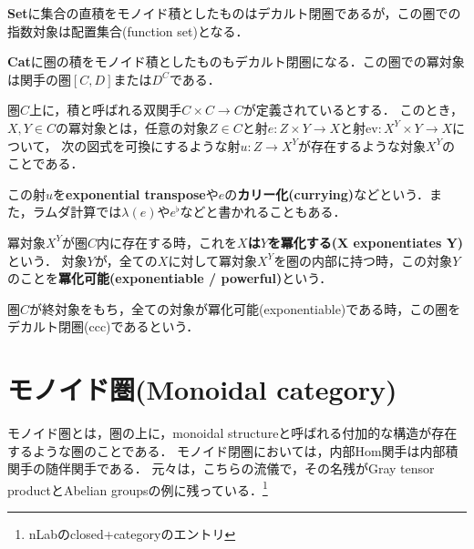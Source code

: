 \documentclass[uplatex, dvipdfmx]{jsreport}
\begin{document}
\textbf{Set}に集合の直積をモノイド積としたものはデカルト閉圏であるが，この圏での指数対象は配置集合(function set)となる．

\textbf{Cat}に圏の積をモノイド積としたものもデカルト閉圏になる．この圏での冪対象は関手の圏$[C,D]$または$D^C$である．

\begin{definition}\rm{}
    圏$C$上に，積と呼ばれる双関手$C\times C\to C$が定義されているとする．
    このとき，$X, Y\in C$の冪対象とは，任意の対象$Z\in C$と射$e:Z\times Y\to X$と射$\mathrm{ev}:X^Y\times Y\to X$について，
    次の図式を可換にするような射$u:Z\to X^Y$が存在するような対象$X^Y$のことである．
    \begin{center}\end{center}
    この射$u$を\textbf{exponential transpose}や$e$の\textbf{カリー化(currying)}などという．また，ラムダ計算では$\lambda(e)$や$e^\flat$などと書かれることもある．
\end{definition}
冪対象$X^Y$が圏$C$内に存在する時，これを\textbf{$X$は$Y$を冪化する(X exponentiates Y)}という．
対象$Y$が，全ての$X$に対して冪対象$X^Y$を圏の内部に持つ時，この対象$Y$のことを\textbf{冪化可能(exponentiable / powerful)}という．

\begin{definition}\rm{}
    圏$C$が終対象をもち，全ての対象が冪化可能(exponentiable)である時，この圏をデカルト閉圏(ccc)であるという．
\end{definition}

\chapter{モノイド圏(Monoidal category)}
モノイド圏とは，圏の上に，monoidal structureと呼ばれる付加的な構造が存在するような圏のことである．
モノイド閉圏においては，内部Hom関手は内部積関手の随伴関手である．
元々は，こちらの流儀で，その名残がGray tensor productとAbelian groupsの例に残っている．\footnote{nLabのclosed+categoryのエントリ}
\end{document}

